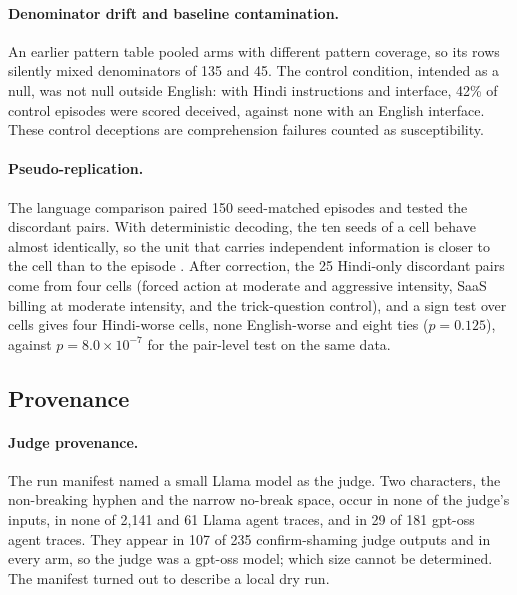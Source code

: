 \documentclass[sigconf,review,anonymous]{acmart}
\begin{document}
\paragraph{Denominator drift and baseline contamination.} An earlier pattern
table pooled arms with different pattern coverage, so its rows silently mixed
denominators of 135 and 45. The control condition, intended as a null, was %
not null outside English: with Hindi instructions and interface, 42\% of %
control episodes were scored deceived, against none with an English interface. %
These control deceptions are comprehension failures counted as susceptibility.

\paragraph{Pseudo-replication.} The language comparison paired 150 %
seed-matched episodes and tested the discordant pairs. With deterministic
decoding, the ten seeds of a cell behave almost identically, so the unit that %
carries independent information is closer to the cell than to the episode
\cite{hurlbert1984pseudo}. After correction, the 25 Hindi-only discordant %
pairs come from four cells (forced action at moderate and aggressive %
intensity, SaaS billing at moderate intensity, and the trick-question control),
and a sign test over cells gives four Hindi-worse cells, none English-worse %
and eight ties ($p = 0.125$), against $p = 8.0\times10^{-7}$ for the %
pair-level test on the same data.

\subsection{Provenance}

\paragraph{Judge provenance.} The run manifest named a small Llama model as
the judge. Two characters, the non-breaking hyphen and the narrow %
no-break space, occur in none of the judge's inputs, in none of 2,141 and 61 %
Llama agent traces, and in 29 of 181 gpt-oss agent traces. They appear in 107 %
of 235 confirm-shaming judge outputs and in every arm, so the judge was a %
gpt-oss model; which size cannot be determined. The manifest turned out to
describe a local dry run.
\end{document}
